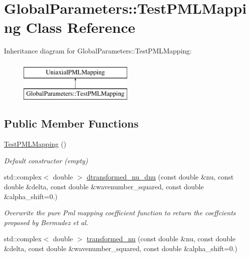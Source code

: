 \hypertarget{classGlobalParameters_1_1TestPMLMapping}{}\section{Global\+Parameters\+:\+:Test\+P\+M\+L\+Mapping Class Reference}
\label{classGlobalParameters_1_1TestPMLMapping}
Inheritance diagram for Global\+Parameters\+:\+:Test\+P\+M\+L\+Mapping\+:\begin{figure}[H]
\begin{center}
\leavevmode
\includegraphics[height=2.000000cm]{classGlobalParameters_1_1TestPMLMapping}
\end{center}
\end{figure}
\subsection*{Public Member Functions}
\begin{DoxyCompactItemize}
\item 
\hyperlink{classGlobalParameters_1_1TestPMLMapping_ac4243d96ef7d60ad7628029a7453480f}{Test\+P\+M\+L\+Mapping} ()
\begin{DoxyCompactList}\small\item\em Default constructor (empty) \end{DoxyCompactList}\item 
std\+::complex$<$ double $>$ \hyperlink{classGlobalParameters_1_1TestPMLMapping_ad3ece98ef692cd1748e1374f7e710514}{dtransformed\+\_\+nu\+\_\+dnu} (const double \&nu, const double \&delta, const double \&wavenumber\+\_\+squared, const double \&alpha\+\_\+shift=0.)
\begin{DoxyCompactList}\small\item\em Overwrite the pure Pml mapping coefficient function to return the coeffcients proposed by Bermudez et al. \end{DoxyCompactList}\item 
std\+::complex$<$ double $>$ \hyperlink{classGlobalParameters_1_1TestPMLMapping_a73188c5c41f61263bebd647f68375732}{transformed\+\_\+nu} (const double \&nu, const double \&delta, const double \&wavenumber\+\_\+squared, const double \&alpha\+\_\+shift=0.)
\end{DoxyCompactItemize}


